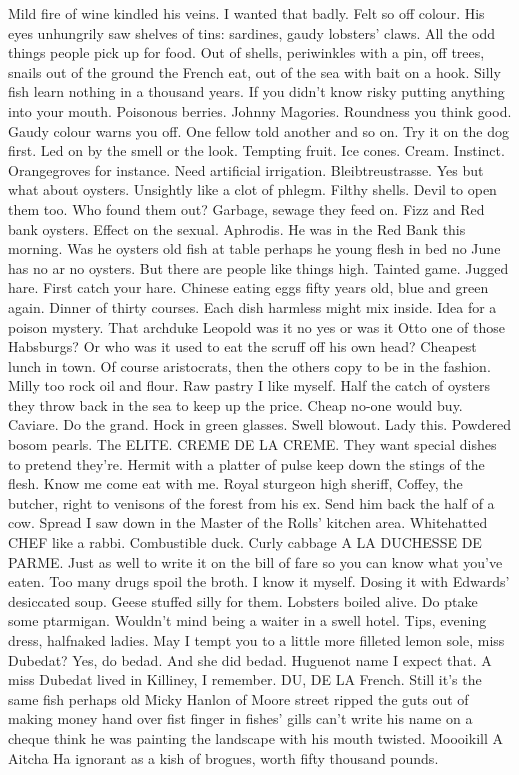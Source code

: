 Mild fire of wine kindled his veins. I wanted that badly. Felt so off
colour. His eyes unhungrily saw shelves of tins: sardines, gaudy
lobsters' claws. All the odd things people pick up for food. Out of
shells, periwinkles with a pin, off trees, snails out of the ground the
French eat, out of the sea with bait on a hook. Silly fish learn nothing
in a thousand years. If you didn't know risky putting anything into your
mouth. Poisonous berries. Johnny Magories. Roundness you think good.
Gaudy colour warns you off. One fellow told another and so on. Try it on
the dog first. Led on by the smell or the look. Tempting fruit. Ice
cones. Cream. Instinct. Orangegroves for instance. Need artificial
irrigation. Bleibtreustrasse. Yes but what about oysters. Unsightly like
a clot of phlegm. Filthy shells. Devil to open them too. Who found them
out? Garbage, sewage they feed on. Fizz and Red bank oysters. Effect on
the sexual. Aphrodis. He was in the Red Bank this morning. Was he oysters
old fish at table perhaps he young flesh in bed no June has no ar no
oysters. But there are people like things high. Tainted game. Jugged
hare. First catch your hare. Chinese eating eggs fifty years old, blue
and green again. Dinner of thirty courses. Each dish harmless might mix
inside. Idea for a poison mystery. That archduke Leopold was it no yes or
was it Otto one of those Habsburgs? Or who was it used to eat the scruff
off his own head? Cheapest lunch in town. Of course aristocrats, then the
others copy to be in the fashion. Milly too rock oil and flour. Raw
pastry I like myself. Half the catch of oysters they throw back in the
sea to keep up the price. Cheap no-one would buy. Caviare. Do the grand.
Hock in green glasses. Swell blowout. Lady this. Powdered bosom pearls.
The ELITE. CREME DE LA CREME. They want special dishes to pretend
they're. Hermit with a platter of pulse keep down the stings of the
flesh. Know me come eat with me. Royal sturgeon high sheriff, Coffey, the
butcher, right to venisons of the forest from his ex. Send him back the
half of a cow. Spread I saw down in the Master of the Rolls' kitchen
area. Whitehatted CHEF like a rabbi. Combustible duck. Curly cabbage A LA
DUCHESSE DE PARME. Just as well to write it on the bill of fare so you
can know what you've eaten. Too many drugs spoil the broth. I know it
myself. Dosing it with Edwards' desiccated soup. Geese stuffed silly for
them. Lobsters boiled alive. Do ptake some ptarmigan. Wouldn't mind being
a waiter in a swell hotel. Tips, evening dress, halfnaked ladies. May I
tempt you to a little more filleted lemon sole, miss Dubedat? Yes, do
bedad. And she did bedad. Huguenot name I expect that. A miss Dubedat
lived in Killiney, I remember. DU, DE LA French. Still it's the same fish
perhaps old Micky Hanlon of Moore street ripped the guts out of making
money hand over fist finger in fishes' gills can't write his name on a
cheque think he was painting the landscape with his mouth twisted.
Moooikill A Aitcha Ha ignorant as a kish of brogues, worth fifty thousand
pounds.

